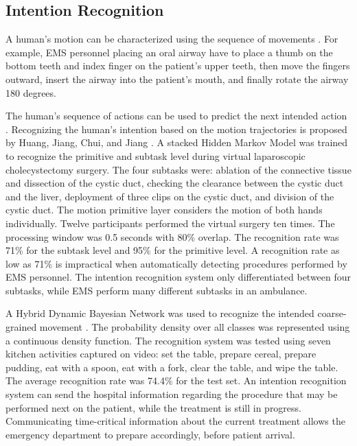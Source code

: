 \subsection{Intention Recognition}
\par A human's motion can be characterized using the sequence of movements \cite{Dirk2010}. For example, EMS personnel placing an oral airway have to place a thumb on the bottom teeth and index finger on the patient's upper teeth, then move the fingers outward, insert the airway into the patient's mouth, and finally rotate the airway 180 degrees.
\par The human's sequence of actions can be used to predict the next intended action \cite{Schrempf2005}. Recognizing the human's intention based on the motion trajectories is proposed by Huang, Jiang, Chui, and Jiang \cite{Yang2017}. A stacked Hidden Markov Model was trained to recognize the primitive and subtask level during virtual laparoscopic cholecystectomy surgery. The four subtasks were: ablation of the connective tissue and dissection of the cystic duct, checking the clearance between the cystic duct and the liver, deployment of three clips on the cystic duct, and division of the cystic duct. The motion primitive layer considers the motion of both hands individually. Twelve participants performed the virtual surgery ten times. The processing window was 0.5 seconds with 80\% overlap. The recognition rate was 71\% for the subtask level and 95\% for the primitive level. A recognition rate as low as 71\% is impractical when automatically detecting procedures performed by EMS personnel. The intention recognition system only differentiated between four subtasks, while EMS perform many different subtasks in an ambulance.
\par A Hybrid Dynamic Bayesian Network was used to recognize the intended coarse-grained movement \cite{Gehrig2011}. The probability density over all classes was represented using a continuous density function. The recognition system was tested using seven kitchen activities captured on video: set the table, prepare cereal, prepare pudding, eat with a spoon, eat with a fork, clear the table, and wipe the table. The average recognition rate was 74.4\% for the test set. An intention recognition system can send the hospital information regarding the procedure that may be performed next on the patient, while the treatment is still in progress. Communicating time-critical information about the current treatment allows the emergency department to prepare accordingly, before patient arrival.

